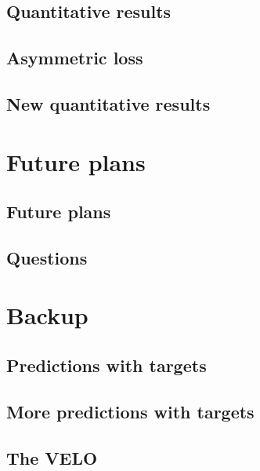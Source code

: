 \documentclass[aspectratio=169, 10pt]{beamer}
\begin{document}
\subsection{Quantitative results}


\subsection{Asymmetric loss}


\subsection {New quantitative results}




\section{Future plans}

\subsection{Future plans}


\subsection{Questions}



\backupbegin
\section{Backup}

\subsection{Predictions with targets}


\subsection{More predictions with targets}


\subsection{The VELO}


\backupend
\end{document}
